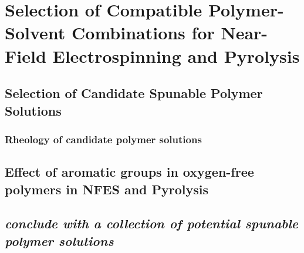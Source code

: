 
\chapter{Selection of Compatible Polymer-Solvent Combinations for Near-Field Electrospinning and Pyrolysis} %

\label{Chapter:3}


\section{Selection of Candidate Spunable Polymer Solutions}



\subsection{Rheology of candidate polymer solutions}



\section{Effect of aromatic groups in oxygen-free polymers in NFES and Pyrolysis}



\section{\emph{conclude with a collection of potential spunable polymer solutions}}